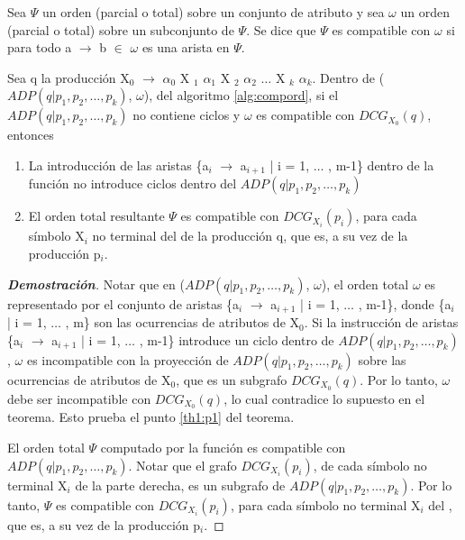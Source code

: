 \begin{definition}
Sea $\Psi$ un orden (parcial o total) sobre un conjunto de atributo y sea $\omega$ un orden (parcial o total) sobre un subconjunto de $\Psi$. Se dice que $\Psi$ es compatible con $\omega$ si para todo a $\rightarrow$ b $\in$ $\omega$ es una arista en $\Psi$.
\end{definition}


\begin{theorem}
\label{th1}
Sea q la producción X$_{0}$ $\rightarrow$ $\alpha_{0}$ X $_{1}$ $\alpha_{1}$ X $_{2}$ $\alpha_{2}$ $\ldots$ X $_{k}$ $\alpha_{k}$. Dentro de ($ADP (q | p_{1}, p_{2}, \dots, p_{k})$, $\omega$), del algoritmo \ref{alg:compord}, si el $ADP (q | p_{1}, p_{2}, \dots, p_{k})$ no contiene ciclos y $\omega$ es compatible con $DCG_{X_{0}}(q)$, entonces

\begin{enumerate}
    \item \label{th1:p1}La introducción de las aristas \{a$_{i}$ $\rightarrow$ a$_{i+1}$ | i = 1, $\ldots$ , m-1\} dentro de la función  no introduce ciclos dentro del $ADP (q | p_{1}, p_{2}, \dots, p_{k})$
 
    \item \label{th1:p2}El orden total resultante $\Psi$ es compatible con $DCG_{X_{i}}(p_{i})$, para cada símbolo X$_{i}$ no terminal del  de la producción q, que es, a su vez  de la producción p$_{i}$.
\end{enumerate}

\end{theorem}

\begin{proof}[\textbf{Demostración}]

Notar que en ($ADP (q | p_{1}, p_{2}, \dots, p_{k})$, $\omega$), el orden total $\omega$ es representado por el conjunto de aristas \{a$_{i}$ $\rightarrow$ a$_{i+1}$ | i = 1, $\ldots$ , m-1\}, donde \{a$_{i}$ | i = 1, $\ldots$ , m\} son las ocurrencias de atributos de X$_{0}$. Si la instrucción de aristas \{a$_{i}$ $\rightarrow$ a$_{i+1}$ | i = 1, $\ldots$ , m-1\} introduce un ciclo dentro de $ADP (q | p_{1}, p_{2}, \dots, p_{k})$, $\omega$ es incompatible con la proyección de $ADP (q | p_{1}, p_{2}, \dots, p_{k})$ sobre las ocurrencias de atributos de X$_{0}$, que es un subgrafo $DCG_{X_{0}}(q)$. Por lo tanto, $\omega$ debe ser incompatible con $DCG_{X_{0}}(q)$, lo cual contradice lo supuesto en el teorema. Esto prueba el punto \ref{th1:p1} del teorema.

El orden total $\Psi$ computado por la función  es compatible con $ADP (q | p_{1}, p_{2}, \dots, p_{k})$. Notar que el grafo $DCG_{X_{i}}(p_{i})$, de cada símbolo no terminal X$_{i}$ de la parte derecha, es un subgrafo de $ADP (q | p_{1}, p_{2}, \dots, p_{k})$. Por lo tanto, $\Psi$ es compatible con $DCG_{X_{i}}(p_{i})$, para cada símbolo no terminal X$_{i}$ del , que es, a su vez  de la producción p$_{i}$.

\end{proof}

